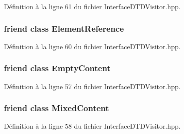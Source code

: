Définition à la ligne 61 du fichier InterfaceDTDVisitor.hpp.

\hypertarget{classdtd_1_1_interface_d_t_d_visitor_a21b7004458ebe5b88f6d6edb6d059a34}{
\subsubsection[{ElementReference}]{\setlength{\rightskip}{0pt plus 5cm}friend class {\bf ElementReference}}}
\label{classdtd_1_1_interface_d_t_d_visitor_a21b7004458ebe5b88f6d6edb6d059a34}


Définition à la ligne 60 du fichier InterfaceDTDVisitor.hpp.

\hypertarget{classdtd_1_1_interface_d_t_d_visitor_a91eaa900fb18be6cd9a7105c964666fb}{
\subsubsection[{EmptyContent}]{\setlength{\rightskip}{0pt plus 5cm}friend class {\bf EmptyContent}}}
\label{classdtd_1_1_interface_d_t_d_visitor_a91eaa900fb18be6cd9a7105c964666fb}


Définition à la ligne 57 du fichier InterfaceDTDVisitor.hpp.

\hypertarget{classdtd_1_1_interface_d_t_d_visitor_a94c4de9fad580ef7aa4f384bf0c2b861}{
\subsubsection[{MixedContent}]{\setlength{\rightskip}{0pt plus 5cm}friend class {\bf MixedContent}}}
\label{classdtd_1_1_interface_d_t_d_visitor_a94c4de9fad580ef7aa4f384bf0c2b861}


Définition à la ligne 58 du fichier InterfaceDTDVisitor.hpp.

